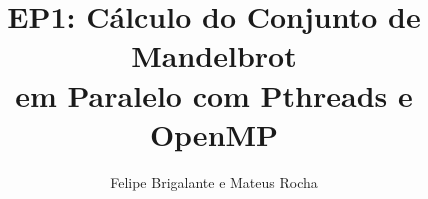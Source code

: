 \documentclass[final,12pt,a4paper]{elsarticle}
\begin{document}
\begin{frontmatter}


\title{EP1: Cálculo do Conjunto de Mandelbrot \\ em Paralelo com Pthreads e OpenMP}




\author{Felipe Brigalante e Mateus Rocha}

\address{MAC 5742-0219 Introdução à Programação Concorrente, Paralela e Distribuída}




\end{frontmatter}
\end{document}
